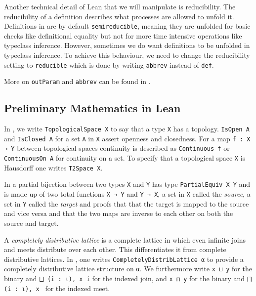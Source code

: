Another technical detail of Lean that we will manipulate is reducibility.
The reducibility of a definition describes what processes are allowed to unfold it. 
Definitions in \mathlib are by default \lstinline|semireducible|, meaning they are unfolded for basic checks like definitional equality but not for more time intensive operations like typeclass inference.
However, sometimes we do want definitions to be unfolded in typeclass inference. 
To achieve this behaviour, we need to change the reducibility setting to \lstinline|reducible| which is done by writing \lstinline|abbrev| instead of \lstinline|def|. 

More on \lstinline|outParam| and \lstinline|abbrev| can be found in \cite{LeanReference2025}.


\subsection{Preliminary Mathematics in Lean}\label{sub:mathinlean}

In \mathlib, we write \lstinline|TopologicalSpace X| to say that a type \lstinline|X| has a topology. 
\lstinline|IsOpen A| and \lstinline|IsClosed A| for a set \lstinline|A| in \lstinline|X| assert openness and closedness. 
For a map \lstinline|f : X → Y| between topological spaces continuity is described as \lstinline|Continuous f| or \lstinline|ContinuousOn A| for continuity on a set. 
To specify that a topological space \lstinline|X| is Hausdorff one writes \lstinline|T2Space X|.

In \mathlib a partial bijection between two types \lstinline|X| and \lstinline|Y| has type \lstinline|PartialEquiv X Y| and is made up of two total functions \lstinline|X → Y| and \lstinline|Y → X|, a set in \lstinline|X| called the \emph{source}, a set in \lstinline|Y| called the \emph{target} and proofs that that the target is mapped to the source and vice versa and that the two maps are inverse to each other on both the source and target.

A \emph{completely distributive lattice} is a complete lattice in which even infinite joins and meets distribute over each other. 
This differentiates it from complete distributive lattices. 
In \mathlib, one writes \lstinline|CompletelyDistribLattice α| to provide a completely distributive lattice structure on \lstinline|α|. 
We furthermore write \lstinline|x ⊔ y| for the binary and \lstinline|⨆ (i : ι), x i| for the indexed join, and \lstinline|x ⊓ y| for the binary and \lstinline|⨅ (i : ι), x | for the indexed meet.
